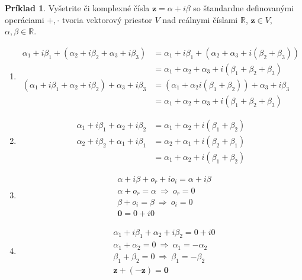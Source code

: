 \documentclass[a4paper, 10pt, ]{article}
\newcommand{\bm}[1]{\mathbf{#1}}
\theoremstyle{definition}
\newtheorem{example}{Príklad}[section]
\begin{document}
\begin{example}
    Vyšetrite či komplexné čísla $\bm{z} = \alpha + i \beta$ so štandardne definovanými operáciami $+, \cdot$ tvoria vektorový priestor $V$ nad reálnymi číslami $\mathbb{R}$, $\bm{z} \in V$, $\alpha, \beta \in \mathbb{R}$.

    \begin{enumerate}
        \item
        \begin{align*}
            \alpha_1 + i \beta_1 + (\alpha_2 + i \beta_2 + \alpha_3 + i \beta_3) &= 
            \alpha_1 + i \beta_1 + (\alpha_2 + \alpha_3 + i (\beta_2 + \beta_3)) \\ &= 
            \alpha_1 + \alpha_2 + \alpha_3 + i (\beta_1 + \beta_2 + \beta_3) \\ 
            (\alpha_1 + i \beta_1 + \alpha_2 + i \beta_2) + \alpha_3 + i \beta_3 &= 
            (\alpha_1 + \alpha_2 i (\beta_1 + \beta_2)) + \alpha_3 + i\beta_3 \\ &= 
            \alpha_1 + \alpha_2 + \alpha_3 + i (\beta_1 + \beta_2 + \beta_3) 
        \end{align*}
        
        \item
        \begin{align*}
            \alpha_1 + i \beta_1 + \alpha_2 + i \beta_2 &= 
            \alpha_1 + \alpha_2 + i (\beta_1 + \beta_2) \\ 
            \alpha_2 + i \beta_2 + \alpha_1 + i \beta_1&= 
            \alpha_2 + \alpha_1 + i (\beta_2 + \beta_1) \\ &= 
            \alpha_1 + \alpha_2 + i (\beta_1 + \beta_2) 
        \end{align*}

        \item
        \begin{align*}
            &\alpha + i \beta + o_r + i o_i = 
            \alpha + i \beta \\ 
            &\alpha + o_r = \alpha \ \Longrightarrow \ o_r = 0 \\
            &\beta + o_i = \beta \ \Longrightarrow \ o_i = 0 \\
            & \bm{0} = 0 + i0 
        \end{align*}

        \item
        \begin{align*}
            &\alpha_1 + i \beta_1 + \alpha_2 + i\beta_2 = 0 + i0 \\
            &\alpha_1 + \alpha_2 = 0 \ \Longrightarrow \ \alpha_1 = -\alpha_2 \\
            &\beta_1 + \beta_2 = 0 \ \Longrightarrow \ \beta_1 = -\beta_2 \\
            & \bm{z} + (-\bm{z}) = \bm{0} 
        \end{align*}


\end{enumerate}
\end{example}
\end{document}
